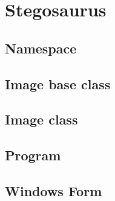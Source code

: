 \chapter{Stegosaurus}
\label{ch:appAlabel}
\section*{Namespace}

\section*{Image base class}

\section*{Image class}

\section*{Program}

\section*{Windows Form}

